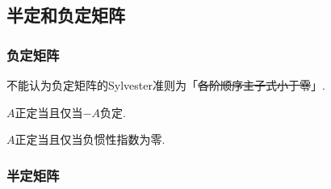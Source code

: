 \documentclass[hidelinks]{ctexart}
\begin{document}


\subsection{半定和负定矩阵} %
\label{sub:半定和负定矩阵}

\subsubsection{负定矩阵} %
\label{ssub:负定矩阵}

\begin{pitfall}
    不能认为负定矩阵的Sylvester准则为「\sout{各阶顺序主子式小于零}」.
\end{pitfall}

\begin{proposition}
    $A$正定当且仅当$-A$负定.
\end{proposition}
\begin{proposition}
    $A$正定当且仅当负惯性指数为零.
\end{proposition}


\subsubsection{半定矩阵} %
\label{ssub:半定矩阵}
\end{document}
